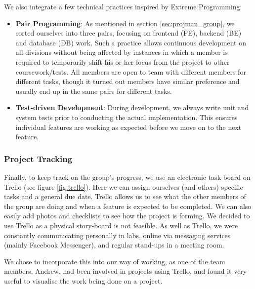 \documentclass[a4paper, titlepage]{article}
\begin{document}
We also integrate a few technical practices inspired by Extreme Programming:
\begin{itemize}
  \item \textbf{Pair Programming}: As mentioned in section \ref{sec:projman_group}, we sorted
        ourselves into three pairs, focusing on frontend (FE), backend (BE) and database (DB) work.
        Such a practice allows continuous development on all divisions without
        being affected by instances in which a member is required to temporarily shift his or her
        focus from the project to other coursework/tests. All members are open to team
        with different members for different tasks, though it turned out members have similar
        preference and usually end up in the same pairs for different tasks.
  \item \textbf{Test-driven Development}: During development, we always write unit and system tests prior to conducting the actual implementation. This ensures individual features are working as expected before we move on to the next feature.

\end{itemize} 

\subsubsection{Project Tracking} \label{sec:projman_tracking}

Finally, to keep track on the group's progress, we use an electronic task
board on Trello (see figure \ref{fig:trello}). Here we can assign ourselves (and others) specific tasks and a general due date. Trello allows us to see what the other members of the group are doing and when a feature is expected to be completed. We can also easily add photos and checklists to see how the project is forming. We decided to use Trello as a physical story-board is not feasible. As well as Trello, we were constantly communicating personally in labs, online via messaging services (mainly Facebook Messenger), and regular stand-ups in a meeting room.

We chose to incorporate this into our way of working, as one of the team members, Andrew, had been involved in projects using Trello, and found it very useful to visualise the work being done on a project.
\end{document}
